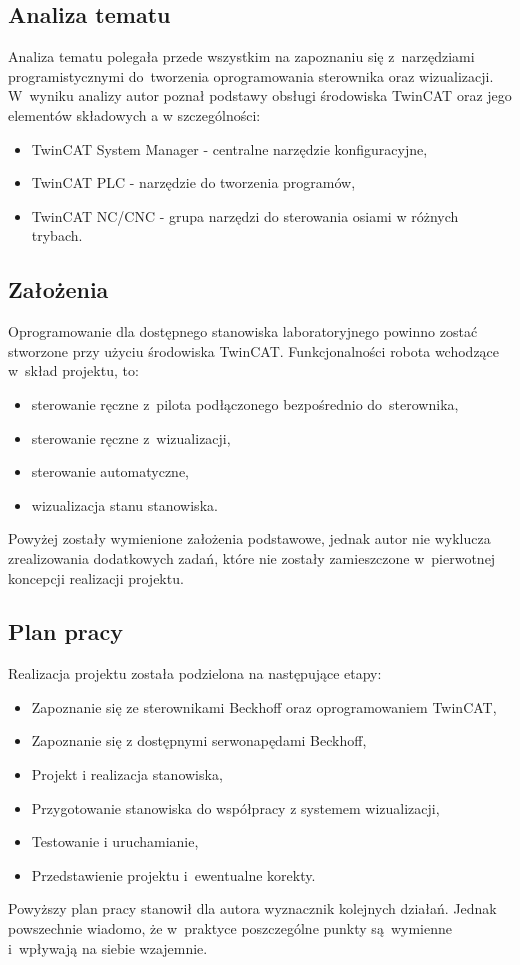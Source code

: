 \subsection{Analiza tematu}
Analiza tematu polegała przede wszystkim na zapoznaniu się z~narzędziami programistycznymi do~tworzenia oprogramowania sterownika oraz wizualizacji.
W~wyniku analizy autor poznał podstawy obsługi środowiska TwinCAT oraz jego elementów składowych a w szczególności:
\begin{itemize}
\item TwinCAT System Manager - centralne narzędzie konfiguracyjne,
\item TwinCAT PLC - narzędzie do tworzenia programów,
\item TwinCAT NC/CNC - grupa narzędzi do sterowania osiami w różnych trybach.
\end{itemize} 



\subsection{Założenia}
Oprogramowanie dla dostępnego stanowiska laboratoryjnego powinno zostać stworzone przy użyciu środowiska TwinCAT. Funkcjonalności robota wchodzące w~skład projektu, to:
\begin{itemize}
\item sterowanie ręczne z~pilota podłączonego bezpośrednio do~sterownika,
\item sterowanie ręczne z~wizualizacji,
\item sterowanie automatyczne, 
\item wizualizacja stanu stanowiska.
\end{itemize}
\indent
\indent Powyżej zostały wymienione założenia podstawowe, jednak autor nie wyklucza zrealizowania dodatkowych zadań, które nie zostały zamieszczone w~pierwotnej koncepcji realizacji projektu.

\subsection{Plan pracy}
Realizacja projektu została podzielona na następujące etapy:
\begin{itemize}
\item Zapoznanie się ze sterownikami Beckhoff oraz oprogramowaniem TwinCAT,
\item Zapoznanie się z dostępnymi serwonapędami Beckhoff,
\item Projekt i realizacja stanowiska,
\item Przygotowanie stanowiska do współpracy z systemem wizualizacji,
\item Testowanie i uruchamianie,
\item Przedstawienie projektu i~ewentualne korekty.
\end{itemize}
\indent
\indent Powyższy plan pracy stanowił dla autora wyznacznik kolejnych działań. Jednak powszechnie wiadomo, że w~praktyce poszczególne punkty są~wymienne i~wpływają na siebie wzajemnie.

